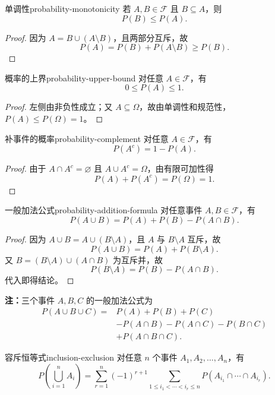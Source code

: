\begin{proposition}{单调性}{probability-monotonicity}
若 $A,B\in\mathscr{F}$ 且 $B\subseteq A$，则
\[
P(B)\leq P(A).
\]
\end{proposition}

\begin{proof}
因为 $A=B\cup(A\setminus B)$，且两部分互斥，故
\[
P(A)=P(B)+P(A\setminus B)\geq P(B).
\]
\end{proof}

\begin{mycorollary}{概率的上界}{probability-upper-bound}
对任意 $A\in\mathscr{F}$，有
\[
0\leq P(A)\leq1.
\]
\end{mycorollary}

\begin{proof}
左侧由非负性成立；又 $A\subseteq\Omega$，故由单调性和规范性，$P(A)\leq P(\Omega)=1$。
\end{proof}

\begin{proposition}{补事件的概率}{probability-complement}
对任意 $A\in\mathscr{F}$，有
\[
P(A^c)=1-P(A).
\]
\end{proposition}

\begin{proof}
由于 $A\cap A^c=\varnothing$ 且 $A\cup A^c=\Omega$，由有限可加性得
\[
P(A)+P(A^c)=P(\Omega)=1.
\]
\end{proof}

\begin{proposition}{一般加法公式}{probability-addition-formula}
对任意事件 $A,B\in\mathscr{F}$，有
\[
P(A\cup B)=P(A)+P(B)-P(A\cap B).
\]
\end{proposition}

\begin{proof}
因为 $A\cup B=A\cup(B\setminus A)$，且 $A$ 与 $B\setminus A$ 互斥，故
\[
P(A\cup B)=P(A)+P(B\setminus A).
\]
又 $B=(B\setminus A)\cup(A\cap B)$ 为互斥并，故
\[
P(B\setminus A)=P(B)-P(A\cap B).
\]
代入即得结论。
\end{proof}

\textbf{注：}三个事件 $A,B,C$ 的一般加法公式为
\[
\begin{aligned}
P(A\cup B\cup C)={}&P(A)+P(B)+P(C)\\
&-P(A\cap B)-P(A\cap C)-P(B\cap C)\\
&+P(A\cap B\cap C).
\end{aligned}
\]

\begin{mytheorem}{容斥恒等式}{inclusion-exclusion}
对任意 $n$ 个事件 $A_1,A_2,\ldots,A_n$，有
\[
P\left(\bigcup_{i=1}^{n}A_i\right)
=\sum_{r=1}^{n}(-1)^{r+1}
\sum_{1\leq i_1<\cdots<i_r\leq n}
P\left(A_{i_1}\cap\cdots\cap A_{i_r}\right).
\]
\end{mytheorem}

